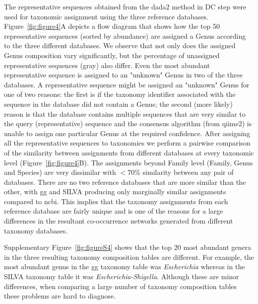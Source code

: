   The representative sequences obtained from the \ac{dada2} method in DC step were used for taxonomic assignment using the three reference databases.
  Figure~\ref{fig:figure4}A depicts a flow diagram that shows how the top 50 representative sequences (sorted by abundance) are assigned a Genus according to the three different databases.
  We observe that not only does the assigned Genus composition vary significantly, but the percentage of unassigned representative sequences (gray) also differ.
  Even the most abundant representative sequence is assigned to an "unknown" Genus in two of the three databases.
  A representative sequence might be assigned an "unknown" Genus for one of two reasons: the first is if the taxonomy identifier associated with the sequence in the database did not contain a Genus; the second (more likely) reason is that the database contains multiple sequences that are very similar to the query (representative) sequence and the consensus algorithm (from \ac{qiime2}) is unable to assign one particular Genus at the required confidence.
  After assigning all the representative sequences to taxonomies we perform a pairwise comparison of the similarity between assignments from different databases at every taxonomic level (Figure~\ref{fig:figure4}B).
  The assignments beyond Family level (Family, Genus and Species) are very dissimilar with $<70\%$ similarity between any pair of databases.
  There are no two reference databases that are more similar than the other, with \ac{gg} and SILVA producing only marginally similar assignments compared to \ac{ncbi}.
  This implies that the taxonomy assignments from each reference database are fairly unique and is one of the reasons for a large differences in the resultant co-occurrence networks generated from different taxonomy databases.
  
  Supplementary Figure~\ref{fig:figureS4} shows that the top 20 most abundant genera in the three resulting taxonomy composition tables are different.
  For example, the most abundant genus in the \ac{gg} taxonomy table was \textit{Escherichia} whereas in the SILVA taxonomy table it was \textit{Escherichia-Shigella}.
  Although these are minor differences, when comparing a large number of taxonomy composition tables these problems are hard to diagnose.

